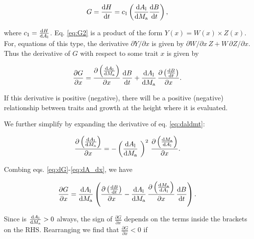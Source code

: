 \documentclass[a4paper,11pt]{article}
\begin{document}
\begin{appendices}
\begin{equation} \label{eq:G2}
G = \frac{{\rm d}H}{{\rm d}t} = c_1   \left(\frac{{\rm d}A_{\rm l}} {{\rm d}M_{\rm a}}  \frac{ {\rm d}B} {{\rm d}t} \right),
\end{equation}

where $c_1 = \frac{{\rm d}H}{{\rm d}A_{\rm l}}$. Eq.
\ref{eq:G2} is a product of the form $Y(x) = W(x) \times Z(x)$. For,
equations of this type, the derivative $\partial{Y}/\partial{x}$ is
given by $\partial{W}/\partial{x} \, Z + W \, \partial{Z}/\partial{x}$. Thus
the derivative of $G$ with respect to some trait $x$  is given by

\begin{equation} \label{eq:dG}
\frac{\partial G} {\partial x} =
\frac{\partial \left(\frac{{\rm d}A_{\rm l}} {{\rm d}M_{\rm a}}\right)}{\partial x}
 \, \frac{ {\rm d}B} {{\rm d}t}
+ \frac{{\rm d}A_{\rm l}} {{\rm d}M_{\rm a}}
\, \frac{\partial \left( \frac{ {\rm d}B} {{\rm d}t}\right)}{\partial x}.
\end{equation}

If this derivative is positive (negative), there will be a positive (negative) relationship
between traits and growth at the height where it is evaluated.

We further simplify by expanding the derivative of eq. \ref{eq:daldmt}:

\begin{equation} \label{eq:dA_dx}
\frac{\partial \left(\frac{{\rm d}A_{\rm l}} {{\rm d}M_{\rm a}}\right)}
{\partial x} = -\left(\frac{{\rm d}A_{\rm l}} {{\rm d}M_{\rm a}}\ \right)^2
\, \frac{\partial \left(\frac{{\rm d}M_{\rm a}} {{\rm d}A_{\rm l}}\right)
}{\partial x}.
\end{equation}

Combing eqs. \ref{eq:dG}-\ref{eq:dA_dx}, we have

\begin{equation} \label{eq:dG2}
\frac{\partial G} {\partial x} =
\frac{{\rm d}A_{\rm l}} {{\rm d}M_{\rm a}}
\left(
\frac{\partial \left( \frac{ {\rm d}B} {{\rm d}t}\right)}{\partial x}
- \frac{{\rm d}A_{\rm l}} {{\rm d}M_{\rm a}}
\,  \frac{\partial \left(\frac{{\rm d}M_{\rm a}} {{\rm d}A_{\rm l}}\right)
}{\partial x}
 \, \frac{ {\rm d}B} {{\rm d}t}
\right).
\end{equation}

Since is $\frac{{\rm d}A_{\rm l}} {{\rm d}M_{\rm a}}>0$ always, the sign
of $\frac{\partial G} {\partial x}$ depends on the terms inside the brackets on the
RHS. Rearranging we find that $\frac
{\partial G} {\partial x} < 0$ if


\end{appendices}
\end{document}
